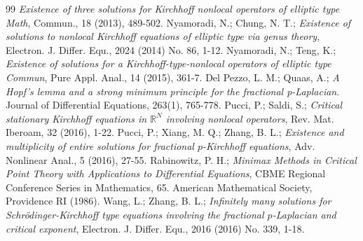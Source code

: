 \documentclass[10pt,a4paper]{amsart}
\numberwithin{equation}{section}
\begin{document}
\begin{thebibliography}{99}
\emph{Existence of three solutions for Kirchhoff nonlocal operators of elliptic 
type Math}, Commun., 18 (2013), 489-502.
 Nyamoradi, N.; Chung,  N. T.;
\emph{Existence  of  solutions  to  nonlocal  Kirchhoff  equations  of  elliptic 
type via genus theory}, Electron. J. Differ. Equ., 2024 (2014) No. 86, 1-12.
 Nyamoradi, N.; Teng, K.;
\emph{Existence of solutions for a Kirchhoff-type-nonlocal operators of elliptic 
type Commun}, Pure Appl. Anal., 14 (2015), 361-7.
 Del Pezzo, L. M.; Quaas, A.;
\emph{A Hopf's lemma and a strong minimum principle for the fractional p-Laplacian}. 
Journal of Differential Equations, 263(1), 765-778.
 Pucci, P.; Saldi, S.;
\emph{Critical stationary Kirchhoff equations in $\mathbb{R}^N$ involving nonlocal operators},
Rev. Mat. Iberoam, 32 (2016), 1-22.
 Pucci, P.; Xiang, M. Q.; Zhang, B. L.;
\emph{Existence and multiplicity of entire solutions for fractional $p$-Kirchhoff 
equations}, Adv. Nonlinear Anal., 5 (2016), 27-55.
 Rabinowitz, P. H.;
\emph{Minimax Methods in Critical Point Theory with Applications to Differential 
Equations}, CBME Regional Conference Series in Mathematics, 65. 
American Mathematical Society, Providence RI (1986).
 Wang, L.; Zhang, B. L.;
\emph{Infinitely many solutions for Schr\"odinger-Kirchhoff type equations involving 
the fractional $p$-Laplacian and critical exponent}, 
Electron. J. Differ. Equ., 2016 (2016) No. 339, 1-18.
\end{thebibliography}
\end{document}
